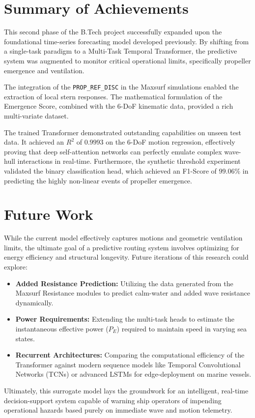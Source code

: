 \section{Summary of Achievements}
This second phase of the B.Tech project successfully expanded upon the foundational time-series forecasting model developed previously. By shifting from a single-task paradigm to a Multi-Task Temporal Transformer, the predictive system was augmented to monitor critical operational limits, specifically propeller emergence and ventilation. 

The integration of the \texttt{PROP\_REF\_DISC} in the Maxsurf simulations enabled the extraction of local stern responses. The mathematical formulation of the Emergence Score, combined with the 6-DoF kinematic data, provided a rich multi-variate dataset. 

The trained Transformer demonstrated outstanding capabilities on unseen test data. It achieved an $R^2$ of $0.9993$ on the 6-DoF motion regression, effectively proving that deep self-attention networks can perfectly emulate complex wave-hull interactions in real-time. Furthermore, the synthetic threshold experiment validated the binary classification head, which achieved an F1-Score of $99.06\%$ in predicting the highly non-linear events of propeller emergence.

\section{Future Work}
While the current model effectively captures motions and geometric ventilation limits, the ultimate goal of a predictive routing system involves optimizing for energy efficiency and structural longevity. Future iterations of this research could explore:
\begin{itemize}
    \item \textbf{Added Resistance Prediction:} Utilizing the data generated from the Maxsurf Resistance modules to predict calm-water and added wave resistance dynamically.
    \item \textbf{Power Requirements:} Extending the multi-task heads to estimate the instantaneous effective power ($P_E$) required to maintain speed in varying sea states.
    \item \textbf{Recurrent Architectures:} Comparing the computational efficiency of the Transformer against modern sequence models like Temporal Convolutional Networks (TCNs) or advanced LSTMs for edge-deployment on marine vessels.
\end{itemize}

Ultimately, this surrogate model lays the groundwork for an intelligent, real-time decision-support system capable of warning ship operators of impending operational hazards based purely on immediate wave and motion telemetry.
